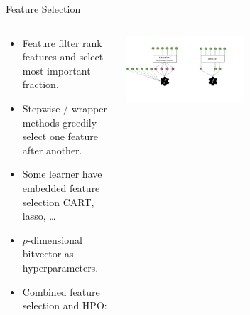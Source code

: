 	\begin{frame}{Feature Selection}
		\begin{columns}
			\begin{column}{0.6\textwidth}
				\begin{itemize}
					
					\item Feature filter rank features and select most important fraction.
					\item Stepwise / wrapper methods greedily select one feature after another. 
					\item Some learner have embedded feature selection CART, lasso, \ldots 
					\item $p$-dimensional bitvector as hyperparameters.
					\item Combined feature selection and HPO: 
					
				\end{itemize}
			\end{column}%
			\begin{column}{0.4\textwidth}
				\begin{center}
					\includegraphics[width=0.5\textwidth, trim=450 100 110 60, clip]{images/feat_extr_vs_selection.pdf}%
					\end{center}
			\end{column}
		\end{columns}
		
	\end{frame}
	

	
	
